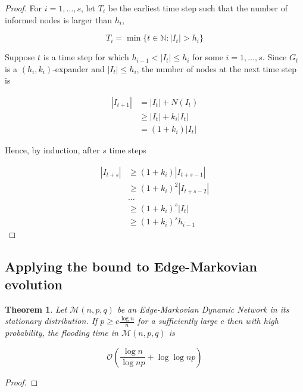 \documentclass[a4paper,11pt]{article}
\newtheorem{theorem}{Theorem}[section]
\theoremstyle{definition}
\begin{document}
\begin{proof}
	For $i = 1,\dots, s$, let $T_i$ be the earliest time step such that the number of informed nodes is larger than $h_i$,

	$$
		T_i = \min \{ t \in \mathbb{N} : |I_t| > h_i \}
	$$

	Suppose $t$ is a time step for which $h_{i-1} < |I_t| \leq h_i$ for some $i = 1,\dots, s$. Since $G_t$ is a $(h_i, k_i)$-expander and $|I_t| \leq h_i$, the number of nodes at the next time step is 
	
	\begin{align*}
		|I_{t+1}| &= |I_t| + N(I_t) \\
		& \geq |I_t| + k_i |I_t| \\
		& = (1 + k_i)|I_t|
	\end{align*}

	Hence, by induction, after $s$ time steps


	\begin{align*}
		|I_{t+s}| &\geq (1 + k_i)|I_{t+s-1}| \\
		&\geq (1 + k_i)^2|I_{t+s-2}|\\
		& \dots \\
		&\geq (1 + k_i)^s |I_t| \\
		&\geq (1 + k_i)^s h_{i-1}
	\end{align*}

\end{proof}

\subsection{Applying the bound to Edge-Markovian evolution}

\begin{theorem}
	Let $\mathcal{M}(n, p, q)$ be an Edge-Markovian Dynamic Network in its stationary distribution. If $p \geq c \frac{\log n}{n}$ for a sufficiently large $c$ then with high probability, the flooding time in $\mathcal{M}(n, p, q)$ is 

	$$
		\mathcal{O}\left(\frac{\log n}{\log np} + \log \log np \right)
	$$
\end{theorem}

\begin{proof}
	
\end{proof}

\end{document}
